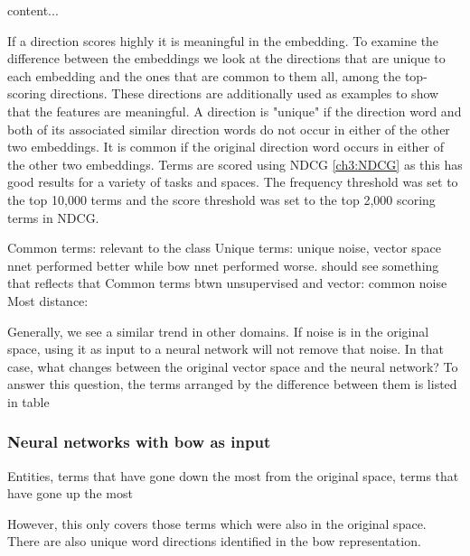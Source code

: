 
\begin{table}[]\label{Top-scoring unique and common terms}
	content...
\end{table}

 If a direction scores highly it is meaningful in the embedding. To examine the difference between the embeddings we look at the directions that are unique to each embedding and the ones that are common to them all, among the top-scoring directions. These directions are additionally used as examples to show that the features are meaningful. A direction is "unique" if the direction word and both of its associated similar direction words do not occur in either of the other two embeddings. It is common if the original direction word occurs in either of the other two embeddings. Terms are scored using NDCG \ref{ch3:NDCG} as this has good results for a variety of tasks and spaces. The frequency threshold was set to the top 10,000 terms and the score threshold was set to the top 2,000 scoring terms in NDCG. 



Common terms: relevant to the class
Unique terms: unique noise, vector space nnet performed better while bow nnet performed worse. should see something that reflects that
Common terms btwn unsupervised and vector: common noise
Most distance: 

Generally, we see a similar trend in other domains. If noise is in the original space, using it as input to a neural network will not remove that noise. In that case, what changes between the original vector space and the neural network? To answer this question, the terms arranged by the difference between them is listed in table 



\subsubsection{Neural networks with bow as input}




\begin{table}[]\label{Unique word directions identified in the bow representation}
	Entities, terms that have gone down the most from the original space, terms that have gone up the most
\end{table}

However, this only covers those terms which were also in the original space. There are also unique word directions identified in the bow representation. %

